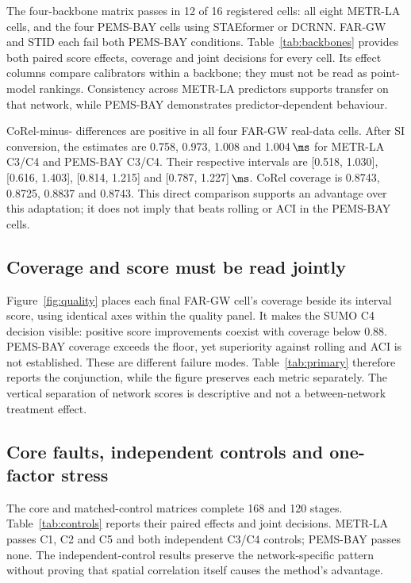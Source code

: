 The four-backbone matrix passes in 12 of 16 registered cells: all eight METR-LA cells, and the four PEMS-BAY cells using STAEformer or DCRNN. FAR-GW and STID each fail both PEMS-BAY conditions. Table~\ref{tab:backbones} provides both paired score effects, coverage and joint decisions for every cell. Its effect columns compare calibrators within a backbone; they must not be read as point-model rankings. Consistency across METR-LA predictors supports transfer on that network, while PEMS-BAY demonstrates predictor-dependent behaviour.

CoRel-minus-\FAR{} differences are positive in all four FAR-GW real-data cells. After SI conversion, the estimates are 0.758, 0.973, 1.008 and 1.004\,$\ms$ for METR-LA C3/C4 and PEMS-BAY C3/C4. Their respective intervals are [0.518, 1.030], [0.616, 1.403], [0.814, 1.215] and [0.787, 1.227]\,$\ms$. CoRel coverage is 0.8743, 0.8725, 0.8837 and 0.8743. This direct comparison supports an advantage over this adaptation; it does not imply that \FAR{} beats rolling or ACI in the PEMS-BAY cells.

\subsection{Coverage and score must be read jointly}
Figure~\ref{fig:quality} places each final FAR-GW cell's coverage beside its interval score, using identical axes within the quality panel. It makes the SUMO C4 decision visible: positive score improvements coexist with coverage below 0.88. PEMS-BAY coverage exceeds the floor, yet superiority against rolling and ACI is not established. These are different failure modes. Table~\ref{tab:primary} therefore reports the conjunction, while the figure preserves each metric separately. The vertical separation of network scores is descriptive and not a between-network treatment effect.


\subsection{Core faults, independent controls and one-factor stress}
The core and matched-control matrices complete 168 and 120 stages. Table~\ref{tab:controls} reports their paired effects and joint decisions. METR-LA passes C1, C2 and C5 and both independent C3/C4 controls; PEMS-BAY passes none. The independent-control results preserve the network-specific pattern without proving that spatial correlation itself causes the method's advantage.

